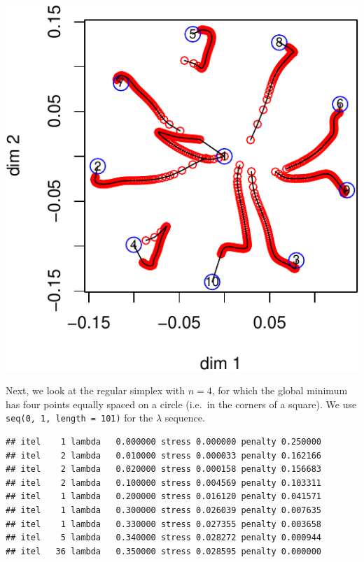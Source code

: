 \documentclass[
  12pt,
]{article}
\begin{document}
\begin{center}\includegraphics{penalty_files/figure-latex/simplex10a-1} \end{center}

Next, we look at the regular simplex with \(n=4\), for which the global
minimum has four points equally spaced on a circle (i.e.~in the corners
of a square). We use \texttt{seq(0,\ 1,\ length\ =\ 101)} for the
\(\lambda\) sequence.

\begin{verbatim}
## itel    1 lambda   0.000000 stress 0.000000 penalty 0.250000 
## itel    2 lambda   0.010000 stress 0.000033 penalty 0.162166 
## itel    2 lambda   0.020000 stress 0.000158 penalty 0.156683 
## itel    2 lambda   0.100000 stress 0.004569 penalty 0.103311 
## itel    1 lambda   0.200000 stress 0.016120 penalty 0.041571 
## itel    1 lambda   0.300000 stress 0.026039 penalty 0.007635 
## itel    1 lambda   0.330000 stress 0.027355 penalty 0.003658 
## itel    5 lambda   0.340000 stress 0.028272 penalty 0.000944 
## itel   36 lambda   0.350000 stress 0.028595 penalty 0.000000
\end{verbatim}
\end{document}

